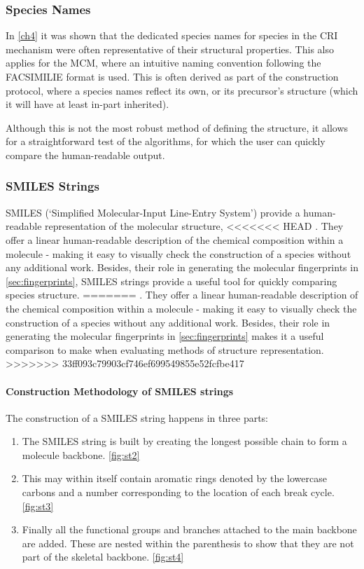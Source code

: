 \subsubsection{Species Names}
In \autoref{ch4} it was shown that the dedicated species names for species in the CRI mechanism were often representative of their structural properties. This also applies for the MCM, where an intuitive naming convention following the FACSIMILIE format is used. This is often derived as part of the construction protocol, where a species names reflect its own, or its precursor's structure (which it will have at least in-part inherited).

Although this is not the most robust method of defining the structure, it allows for a straightforward test of the algorithms, for which the user can quickly compare the human-readable output.


\subsubsection{SMILES Strings}\label{sec:SMILES}


 SMILES (`Simplified Molecular-Input Line-Entry System') provide a human-readable representation of the molecular structure,
<<<<<<< HEAD
 \citep{smiles}. They offer a linear human-readable description of the chemical composition within a molecule - making it easy to visually check the construction of a species without any additional work. Besides, their role in generating the molecular fingerprints in \autoref{sec:fingerprints}, SMILES strings provide a useful tool for quickly comparing species structure.
=======
 \citep{SMILES}. They offer a linear human-readable description of the chemical composition within a molecule - making it easy to visually check the construction of a species without any additional work. Besides, their role in generating the molecular fingerprints in \autoref{sec:fingerprints} makes it a useful comparison to make when evaluating methods of structure representation.
>>>>>>> 33ff093c79903cf746ef699549855e52fcfbe417

\paragraph*{Construction Methodology of SMILES strings}
The construction of a SMILES string happens in three parts:

\begin{enumerate}
    \item The SMILES string is built by creating the longest possible chain to form a molecule backbone.
    \autoref{fig:st2}

    \item This may within itself contain aromatic rings denoted by the lowercase carbons and a number corresponding to the location of each break cycle. \autoref{fig:st3}

    \item Finally all the functional groups and branches attached to the main backbone are added. These are nested within the parenthesis to show that they are not part of the skeletal backbone. \autoref{fig:st4}
\end{enumerate}




